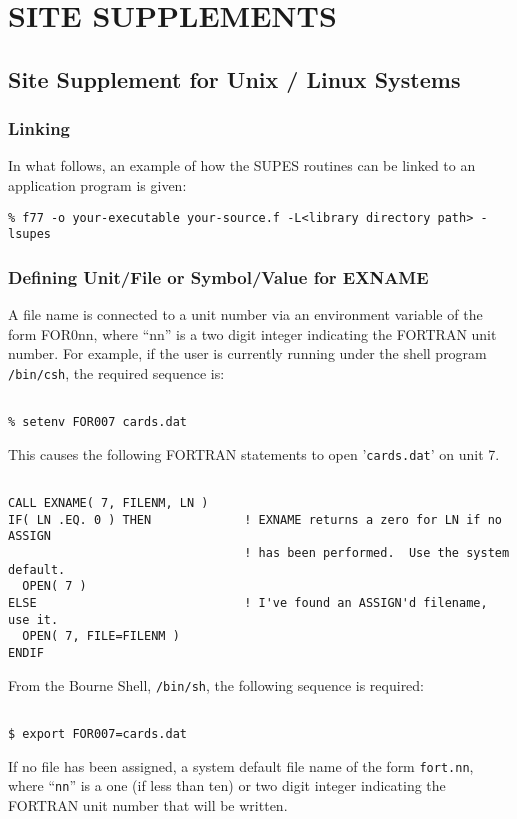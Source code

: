 \chapter{SITE SUPPLEMENTS} \label{sec:site}

\section{Site Supplement for Unix / Linux Systems}

\subsection{Linking}
In what follows,
an example of how the SUPES routines can be linked to an application program
is given:
\begin{verbatim}
% f77 -o your-executable your-source.f -L<library directory path> -lsupes
\end{verbatim}

\subsection{Defining Unit/File or Symbol/Value for EXNAME}
A file name is connected to a unit number via an environment
variable of the form FOR0nn,
where ``nn'' is a two digit integer indicating the FORTRAN unit number. For
example, if the user is currently running under the shell program
\verb+/bin/csh+, the required sequence is:
\begin{verbatim}

% setenv FOR007 cards.dat

\end{verbatim}
This causes the following FORTRAN statements to open '\verb+cards.dat+' on unit 7.
\begin{verbatim}

CALL EXNAME( 7, FILENM, LN )
IF( LN .EQ. 0 ) THEN             ! EXNAME returns a zero for LN if no ASSIGN
                                 ! has been performed.  Use the system default.
  OPEN( 7 )
ELSE                             ! I've found an ASSIGN'd filename, use it.
  OPEN( 7, FILE=FILENM )
ENDIF

\end{verbatim}

From the Bourne Shell,
\verb+/bin/sh+,
the following sequence is required:
\begin{verbatim}

$ export FOR007=cards.dat

\end{verbatim}
If no file has been assigned,
a system default file name of the form \verb+fort.nn+, where ``\verb+nn+''
is a one (if less than
ten) or two digit integer indicating the FORTRAN unit number that will be written.


